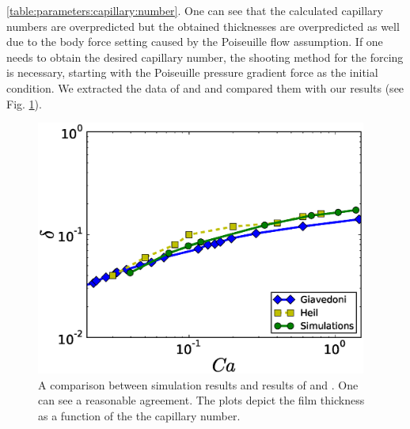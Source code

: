 \documentclass[preprint,12pt]{elsarticle}
\begin{document}
\ref{table:parameters:capillary:number}. One can see that the calculated
capillary numbers are overpredicted but the obtained thicknesses are overpredicted
as well due to the body force setting caused by the Poiseuille flow assumption. If one
needs to obtain the desired capillary number, the shooting method for the forcing is
necessary, starting with the Poiseuille pressure gradient force as the initial condition. We extracted
the data of 
\citet{giavedoni-numerical} and \citet{heil-bretherton} and compared them with our results (see 
Fig. \ref{fig:capillary:comparison}).
\begin{figure}
\includegraphics[width=0.97\textwidth]{Figures/Capillary/capillaries_comparison.eps}
\caption{A comparison between simulation results and results of
\citet{giavedoni-numerical} and \citet{heil-bretherton}. One can see a
reasonable agreement. The plots depict the film thickness as a function of the
the capillary number.\label{fig:capillary:comparison}}
\end{figure}
\end{document}
